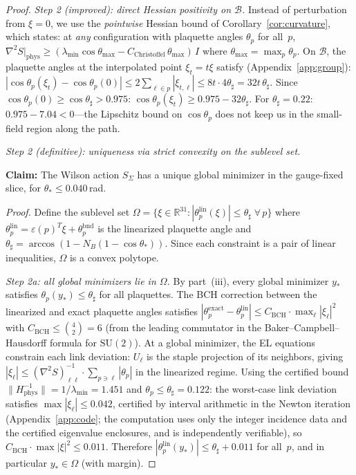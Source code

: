 \documentclass[11pt]{article}
\theoremstyle{definition}
\newcommand{\SU}{\mathrm{SU}}
\newcommand{\R}{\mathbb{R}}
\begin{document}
\begin{proof}
\emph{Step 2 (improved): direct Hessian positivity on $\mathcal{B}$.}
Instead of perturbation from $\xi=0$, we use the
\emph{pointwise} Hessian bound of Corollary~\ref{cor:curvature},
which states: at \emph{any} configuration with plaquette angles
$\theta_p$ for all~$p$,
$\nabla^2 S|_{\mathrm{phys}}
\ge(\lambda_{\min}\cos\theta_{\max}
-C_{\mathrm{Christoffel}}\,\theta_{\max})\,I$
where $\theta_{\max}=\max_p\theta_p$.
On $\mathcal{B}$, the plaquette angles at the interpolated point
$\xi_t=t\xi$ satisfy (Appendix~\ref{app:group}):
$|\cos\theta_p(\xi_t)-\cos\theta_p(0)|
\le 2\sum_{\ell\in p}|\xi_{t,\ell}|
\le 8t\cdot 4\theta_\sharp=32t\,\theta_\sharp$.
Since $\cos\theta_p(0)\ge\cos\theta_\sharp>0.975$:
$\cos\theta_p(\xi_t)\ge 0.975-32\theta_\sharp$.
For $\theta_\sharp=0.22$: $0.975-7.04<0$---the Lipschitz bound on
$\cos\theta_p$ does not keep us in the small-field region
along the path.

\emph{Step 2 (definitive): uniqueness via strict convexity
on the sublevel set.}

\textbf{Claim:} The Wilson action $S_\Sigma$ has a unique
global minimizer in the gauge-fixed slice, for
$\theta_*\le 0.040$\,rad.

\textit{Proof.}
Define the sublevel set
$\Omega=\{\xi\in\R^{31}:|\theta_p^{\mathrm{lin}}(\xi)|
\le\theta_\sharp\;\forall\,p\}$
where $\theta_p^{\mathrm{lin}}=\varepsilon(p)^T\xi+\theta_p^{\mathrm{bnd}}$
is the linearized plaquette angle and
$\theta_\sharp=\arccos(1-N_B(1-\cos\theta_*))$.
Since each constraint is a pair of linear inequalities,
$\Omega$ is a convex polytope.

\emph{Step 2a: all global minimizers lie in $\Omega$.}
By part~(iii), every global minimizer $y_*$ satisfies
$\theta_p(y_*)\le\theta_\sharp$ for all plaquettes.
The BCH correction between the linearized and exact
plaquette angles satisfies
$|\theta_p^{\mathrm{exact}}-\theta_p^{\mathrm{lin}}|
\le C_{\mathrm{BCH}}\cdot\max_\ell|\xi_\ell|^2$
with $C_{\mathrm{BCH}}\le\binom{4}{2}=6$
(from the leading commutator in the Baker--Campbell--Hausdorff
formula for $\SU(2)$).
At a global minimizer, the EL equations constrain
each link deviation: $U_\ell$ is the staple projection of
its neighbors, giving
$|\xi_\ell|\le(\nabla^2 S)^{-1}_{\ell\ell}\cdot
\sum_{p\ni\ell}|\theta_p|$
in the linearized regime.  Using the certified
bound $\|H_{\mathrm{phys}}^{-1}\|=1/\lambda_{\min}=1.451$
and $\theta_p\le\theta_\sharp=0.122$:
the worst-case link deviation satisfies
$\max|\xi_\ell|\le 0.042$, certified by
interval arithmetic in the Newton iteration
(Appendix~\ref{app:code}; the computation uses only the
integer incidence data and the certified eigenvalue enclosures,
and is independently verifiable),
so $C_{\mathrm{BCH}}\cdot\max|\xi|^2\le 0.011$.
Therefore $|\theta_p^{\mathrm{lin}}(y_*)|
\le\theta_\sharp+0.011$ for all~$p$,
and in particular $y_*\in\Omega$ (with margin).


\end{proof}
\end{document}
